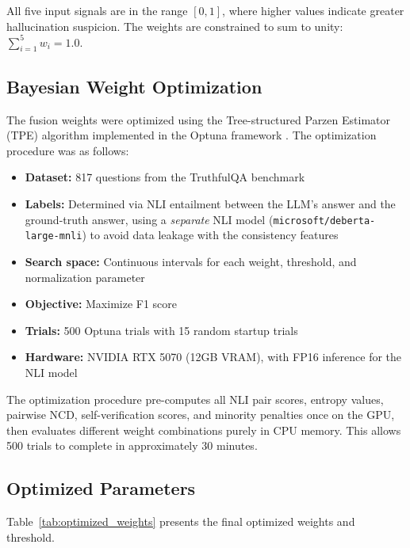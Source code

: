 \noindent
All five input signals are in the range $[0, 1]$, where higher values indicate greater hallucination suspicion. The weights are constrained to sum to unity: $\sum_{i=1}^{5} w_i = 1.0$.

\subsection{Bayesian Weight Optimization}

The fusion weights were optimized using the Tree-structured Parzen Estimator (TPE) algorithm \cite{bergstra2011algorithms} implemented in the Optuna framework \cite{akiba2019optuna}. The optimization procedure was as follows:

\begin{itemize}
    \item \textbf{Dataset:} 817 questions from the TruthfulQA benchmark \cite{lin2022truthfulqa}
    \item \textbf{Labels:} Determined via NLI entailment between the LLM's answer and the ground-truth answer, using a \emph{separate} NLI model (\texttt{microsoft/deberta-large-mnli}) to avoid data leakage with the consistency features
    \item \textbf{Search space:} Continuous intervals for each weight, threshold, and normalization parameter
    \item \textbf{Objective:} Maximize F1 score
    \item \textbf{Trials:} 500 Optuna trials with 15 random startup trials
    \item \textbf{Hardware:} NVIDIA RTX 5070 (12GB VRAM), with FP16 inference for the NLI model
\end{itemize}

The optimization procedure pre-computes all NLI pair scores, entropy values, pairwise NCD, self-verification scores, and minority penalties once on the GPU, then evaluates different weight combinations purely in CPU memory. This allows 500 trials to complete in approximately 30 minutes.

\subsection{Optimized Parameters}

Table~\ref{tab:optimized_weights} presents the final optimized weights and threshold.

